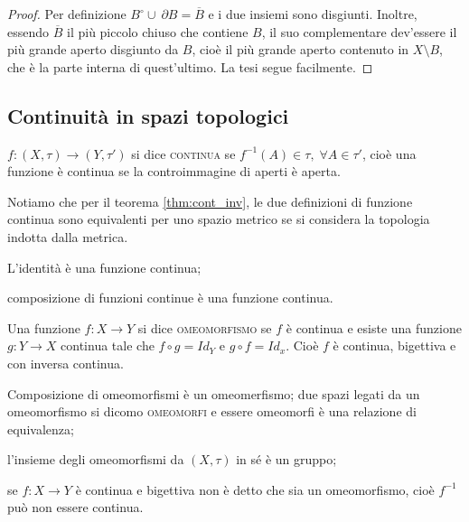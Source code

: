 \documentclass{article}
\begin{document}
\begin{proof}
	Per definizione $B^{\circ} \cup\ \partial B=\overline{B}$ e i due insiemi sono disgiunti. Inoltre, essendo $\overline B$ il più piccolo chiuso che contiene $B$, il suo complementare dev'essere il più grande aperto disgiunto da $B$, cioè il più grande aperto contenuto in $X \setminus B$, che è la parte interna di quest'ultimo. La tesi segue facilmente.
\end{proof}

\subsection{Continuità in spazi topologici}

\begin{defn}
$f: (X, \tau) \rightarrow (Y, \tau')$ si dice \textsc{continua} se ${f^{-1}(A)
\in \tau,}\; {\forall A \in \tau'}$, cioè una funzione \`e continua se la
controimmagine di aperti \`e aperta.
\end{defn}

Notiamo che per il teorema \ref{thm:cont_inv}, le due
definizioni di funzione continua sono equivalenti per uno spazio metrico se si
considera la topologia indotta dalla metrica.

\begin{thm}
\begin{nlist}
\item L'identità è una funzione continua;
\item composizione di funzioni continue è una funzione continua.
\end{nlist}
\end{thm}

\begin{defn}
Una funzione $f: X \rightarrow Y$ si dice \textsc{omeomorfismo} se $f$ è
continua e esiste una funzione $g:Y\rightarrow X$ continua tale che $f \circ g =
Id_Y$ e $g \circ f = Id_x$. Cio\`e $f$ \`e continua, bigettiva e con inversa
continua.
\end{defn}

\begin{oss}
	\begin{nlist}
	\item Composizione di omeomorfismi è un omeomerfismo; due spazi legati da un
	omeomorfismo si dicomo \textsc{omeomorfi} e essere omeomorfi è una relazione
	di equivalenza;
	\item l'insieme degli omeomorfismi da $(X, \tau)$ in sé è un gruppo;
	\item se $f:X \rightarrow Y$ è continua e bigettiva non è detto che sia un
	omeomorfismo, cioè $f^{-1}$ può non essere continua.
    \marginpar{\warningsign}
\end{nlist}
\end{oss}
\end{document}

